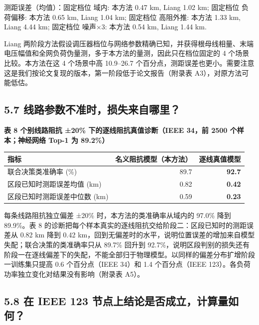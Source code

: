 \documentclass[
  11pt,
]{ctexart}
\begin{document}
测距误差（均值）：固定档位 域内: 本方法 0.47 km, Liang 1.02 km; 固定档位
负荷偏移: 本方法 0.65 km, Liang 1.04 km; 固定档位 高阻外推: 本方法 1.33
km, Liang 4.44 km; 固定档位 噪声×3: 本方法 0.54 km, Liang 1.44 km.

Liang
两阶段方法假设调压器档位与网络参数精确已知，并获得根母线相量、末端电压幅值和全网负荷伪量测，多于本方法的量测，因此只在档位固定的
4 个场景比较。本方法在这 4 个场景中高 10.9--26.7
个百分点，测距误差也更小。需要注意这是我们按论文复现的版本，第一阶段低于论文报告（附录表
A3），对原方法可能低估。

\hypertarget{ux7ebfux8defux53c2ux6570ux4e0dux51c6ux65f6ux635fux5931ux6765ux81eaux54eaux91cc}{%
\subsection{5.7
线路参数不准时，损失来自哪里？}\label{ux7ebfux8defux53c2ux6570ux4e0dux51c6ux65f6ux635fux5931ux6765ux81eaux54eaux91cc}}

\textbf{表 8 个别线路阻抗 ±20\% 下的逐线阻抗真值诊断（IEEE 34，前 2500
个样本；神经网络 Top-1 为 89.2\%）}

\begin{longtable}[]{@{}lrr@{}}
\toprule\noalign{}
指标 & 名义阻抗模型（本方法） & 逐线真值模型 \\
\midrule\noalign{}
\endhead
\bottomrule\noalign{}
\endlastfoot
联合决策类准确率 (\%) & 89.7 & \textbf{92.7} \\
区段已知时测距误差均值 (km) & 0.82 & \textbf{0.42} \\
区段已知时测距误差中位数 (km) & 0.59 & \textbf{0.23} \\
\end{longtable}

每条线路阻抗独立偏差 ±20\% 时，本方法的类准确率从域内的 97.0\% 降到
89.9\%。表 8
的诊断把每个样本真实的逐线阻抗交给阶段二：区段已知时的测距误差从 0.82 km
降到 0.42
km，回到无偏差时的水平，说明位置误差的增加来自模型失配；联合决策的类准确率只从
89.7\% 回升到
92.7\%，说明区段判别的损失还有阶段一在逐线偏差下的失配，不能全部归于物理模型。以同样的偏差分布扩增阶段一训练集只提高
0.6 个百分点（IEEE 34）和 1.4 个百分点（IEEE
123）。各负荷功率独立变化对结果没有影响（附录表 A5）。

\hypertarget{ux5728-ieee-123-ux8282ux70b9ux4e0aux7ed3ux8bbaux662fux5426ux6210ux7acbux8ba1ux7b97ux91cfux5982ux4f55}{%
\subsection{5.8 在 IEEE 123
节点上结论是否成立，计算量如何？}\label{ux5728-ieee-123-ux8282ux70b9ux4e0aux7ed3ux8bbaux662fux5426ux6210ux7acbux8ba1ux7b97ux91cfux5982ux4f55}}
\end{document}

